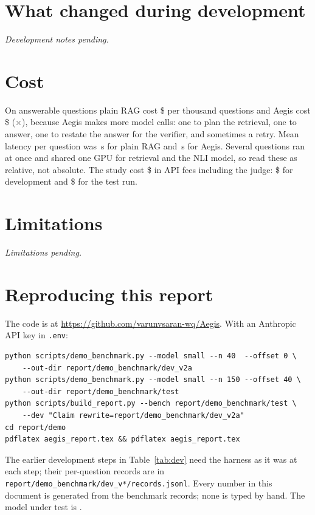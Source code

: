 \documentclass[11pt]{article}
\newcommand{\RepoURL}{https://github.com/varunvsaran-wq/Aegis}
\newcommand{\DevProse}{\textit{Development notes pending.}}%
\newcommand{\LimitsProse}{\textit{Limitations pending.}}%
\begin{document}
\section{What changed during development}
\label{sec:dev}

\DevProse


\section{Cost}

On answerable questions plain RAG cost \$\CostPlain{} per thousand questions
and Aegis cost \$\CostAegis{} (\CostRatio$\times$), because Aegis makes more
model calls: one to plan the retrieval, one to answer, one to restate the
answer for the verifier, and sometimes a retry. Mean latency per question was
\LatencyPlain\,s for plain RAG and \LatencyAegis\,s for Aegis. Several
questions ran at once and shared one GPU for retrieval and the NLI model, so
read these as relative, not absolute. The study cost \$\StudySpend{} in API
fees including the judge: \$\DevSpend{} for development and \$\TotalSpend{}
for the test run.

\section{Limitations}

\LimitsProse

\section{Reproducing this report}

The code is at \url{\RepoURL}. With an Anthropic API key in \texttt{.env}:

\begin{verbatim}
python scripts/demo_benchmark.py --model small --n 40  --offset 0 \
    --out-dir report/demo_benchmark/dev_v2a
python scripts/demo_benchmark.py --model small --n 150 --offset 40 \
    --out-dir report/demo_benchmark/test
python scripts/build_report.py --bench report/demo_benchmark/test \
    --dev "Claim rewrite=report/demo_benchmark/dev_v2a"
cd report/demo
pdflatex aegis_report.tex && pdflatex aegis_report.tex
\end{verbatim}

The earlier development steps in Table~\ref{tab:dev} need the harness as it
was at each step; their per-question records are in
\texttt{report/demo\_benchmark/dev\_v*/records.jsonl}.
Every number in this document is generated from the benchmark records; none is
typed by hand. The model under test is \texttt{\ModelName}.
\end{document}
